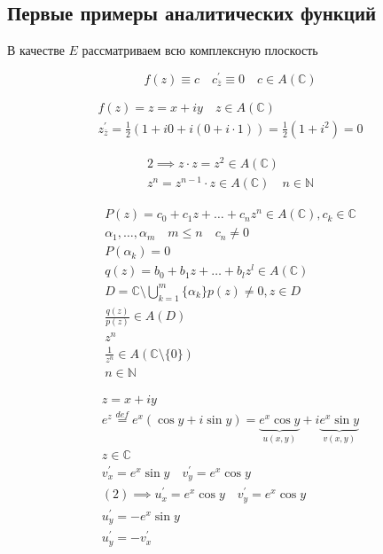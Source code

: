 \documentclass[main]{subfiles}
\begin{document}
\subsection*{Первые примеры аналитических функций}
В качестве $E$ рассматриваем всю комплексную плоскость
\begin{example}
    \[ f(z) \equiv c \quad c^\prime_{\overline{z}} \equiv 0 \quad c \in A(\mathbb{C}) \]
\end{example}
\begin{example}
    \begin{gather*}
        f(z) = z = x +iy \quad z \in A(\mathbb{C}) \\
        z^\prime_{\overline{z}} = \frac{1}{2} (1 + i0 + i(0 + i \cdot 1)) = \frac{1}{2}(1+ i^2) = 0
    \end{gather*}
\end{example}
\begin{example}
    \begin{gather*}
        2 \implies z \cdot z = z^2 \in A(\mathbb{C}) \\
        z^n = z^{n-1} \cdot z \in A(\mathbb{C}) \quad n \in \mathbb{N} 
    \end{gather*}
\end{example}
\begin{example}
    \begin{gather*}
        P(z) = c_0 + c_1z + \ldots + c_nz^n \in A(\mathbb{C}), c_k \in \mathbb{C} \\
        \alpha_1, \ldots, \alpha_m \quad m \leq n \quad c_n \ne 0 \\
        P(\alpha_k) = 0 \\
        q(z) = b_0 + b_1z + \ldots + b_lz^l \in A(\mathbb{C}) \\
        D = \mathbb{C} \setminus \bigcup^m_{k=1} \{ \alpha_k \}
        p(z) \ne 0, z \in D \\
        \frac{q(z)}{p(z)} \in A(D) \\
        z^n \\
        \frac{1}{z^n} \in A (\mathbb{C} \setminus \{ 0 \}) \\
        n \in \mathbb{N}
    \end{gather*}
\end{example}
\begin{example}
    \begin{gather*}
        z = x + iy\\
        e^z \stackrel{def}{=} e^x(\cos y + i \sin y) = \underbrace{e^x \cos y}_{u(x,y)} + i \underbrace{e^x \sin y}_{v(x,y)} \tag{2} \\
        z \in \mathbb{C} \\
        v^\prime_x = e^x \sin y \quad v^\prime_y = e^x \cos y \\
        (2) \implies  u^\prime_x = e^x \cos y  \quad  v^\prime_y = e^x \cos y \\
        u^\prime_y = -e^x \sin y \\
        u^\prime_y = -v^\prime_x
    \end{gather*}
\end{example}
\end{document}
